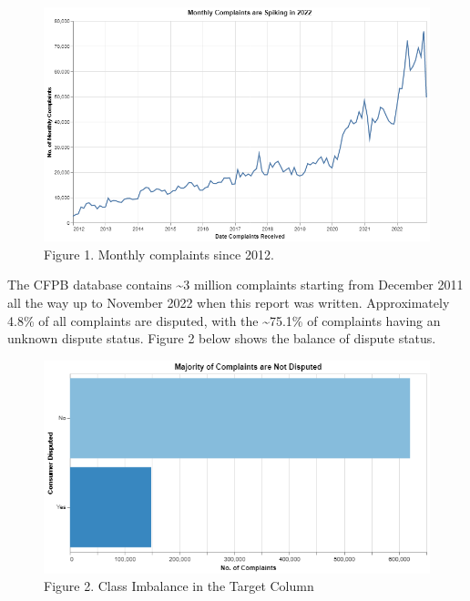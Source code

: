 \documentclass[
  letterpaper,
  DIV=11,
  numbers=noendperiod]{scrartcl}
\begin{document}
\begin{figure}

{\centering \includegraphics{assets/complaints_over_time_line.png}

}

\caption{Figure 1. Monthly complaints since 2012.}

\end{figure}

The CFPB database contains \textasciitilde3 million complaints starting
from December 2011 all the way up to November 2022 when this report was
written. Approximately 4.8\% of all complaints are disputed, with the
\textasciitilde75.1\% of complaints having an unknown dispute status.
Figure 2 below shows the balance of dispute status.

\begin{figure}

{\centering \includegraphics{assets/disputed_bar.png}

}

\caption{Figure 2. Class Imbalance in the Target Column}

\end{figure}
\end{document}
